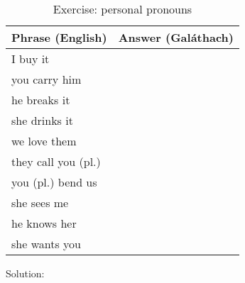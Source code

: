 \begin{table}[H]
\centering
\begin{tabu}{|l|p{10.0cm}|}
  \toprule
  \textbf{Phrase (English)} & \textbf{Answer (Gal\'{a}thach)}\\
  \toprule
  I buy it & \\
  \midrule
  you carry him & \\
  \midrule
  he breaks it & \\
  \midrule
  she drinks it & \\
  \midrule
  we love them & \\
  \midrule
  they call you (pl.) & \\
  \midrule
  you (pl.) bend us & \\
  \midrule
  she sees me & \\
  \midrule
  he knows her & \\
  \midrule
  she wants you & \\
  \bottomrule
\end{tabu}
\label{exercises_personal_pronouns}
\caption{Exercise: personal pronouns}
\end{table}

Solution:\\
\begin{table}[H]
\centering
{}
\label{solution_personal_pronouns}
\caption{Solution: personal pronouns}
\end{table}

